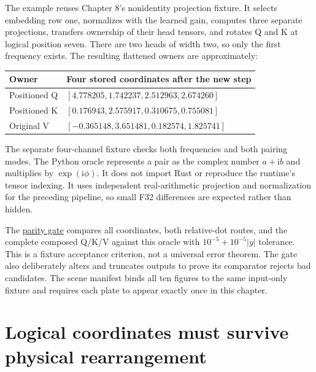 The example reuses Chapter 8's nonidentity projection fixture. It
selects embedding row one, normalizes with the learned gain, computes
three separate projections, transfers ownership of their head tensors,
and rotates Q and K at logical position seven. There are two heads of
width two, so only the first frequency exists. The resulting flattened
owners are approximately:

{\def\LTcaptype{none} %
\begin{longtable}[]{@{}ll@{}}
\toprule\noalign{}
Owner & Four stored coordinates after the new step \\
\midrule\noalign{}
\endhead
\bottomrule\noalign{}
\endlastfoot
Positioned Q & \([4.778205,1.742237,2.512963,2.674260]\) \\
Positioned K & \([0.176943,2.575917,0.310675,0.755081]\) \\
Original V & \([-0.365148,3.651481,0.182574,1.825741]\) \\
\end{longtable}
}

The separate four-channel fixture checks both frequencies and both
pairing modes. The Python oracle represents a pair as the complex number
\(a+\mathrm{i}b\) and multiplies by \(\exp(\mathrm{i}\phi)\). It does
not import Rust or reproduce the runtime's tensor indexing. It uses
independent real-arithmetic projection and normalization for the
preceding pipeline, so small F32 differences are expected rather than
hidden.

The
\href{https://github.com/hermonai/inside-the-llm-engine/blob/astra-visual-rewrite/scripts/check-rope-visual-parity.py}{parity
gate} compares all coordinates, both relative-dot routes, and the
complete composed Q/K/V against this oracle with \(10^{-5}+10^{-5}|y|\)
tolerance. This is a fixture acceptance criterion, not a universal error
theorem. The gate also deliberately alters and truncates outputs to
prove its comparator rejects bad candidates. The scene manifest binds
all ten figures to the same input-only fixture and requires each plate
to appear exactly once in this chapter.

\section{Logical coordinates must survive physical
rearrangement}\label{logical-coordinates-must-survive-physical-rearrangement}


